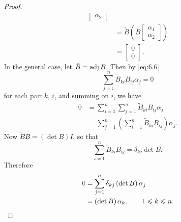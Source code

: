 \begin{proof}
\begin{align*}
\begin{bmatrix}
            \alpha_2
        \end{bmatrix}
        \\
        &=\tilde{B}\left(B
        \begin{bmatrix}
            \alpha_1 \\
            \alpha_2
        \end{bmatrix}
        \right)\\
        &=
        \begin{bmatrix}
            0 \\
            0
        \end{bmatrix}
        .
    \end{align*}
    In the general case, let \(\tilde{B}=\operatorname{adj} B\). Then by \eqref{eq:6.6}
    \begin{equation*}
        \sum_{j=1}^n\tilde{B}_{ki}B_{ij}\alpha_j=0
    \end{equation*}
    for each pair \(k\), \(i\), and summing on \(i\), we have
    \begin{align*}
        0&=\sum_{i=1}^n\sum_{j=1}^n\tilde{B}_{ki}B_{ij}\alpha_j\\
         &=\sum_{j=1}^n\left(\sum_{i=1}^n\tilde{B}_{ki}B_{ij}\right)\alpha_j.
    \end{align*}
    Now \(\tilde{B}B=\left(\det B\right)I\), so that
    \begin{equation*}
        \sum_{i=1}^n\tilde{B}_{ki}B_{ij}=\delta_{kj}\det B.
    \end{equation*}
    Therefore
    \begin{align*}
        0&=\sum_{j=1}^n\delta_{kj}\left(\det B\right)\alpha_j\\
         &=\left(\det B\right)\alpha_k,\qquad1\leqslant k\leqslant n.\qedhere
    \end{align*}
\end{proof}

